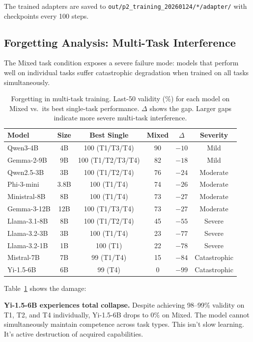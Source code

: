 \documentclass[11pt]{article}
\begin{document}
The trained adapters are saved to \texttt{out/p2\_training\_20260124/*/adapter/} with checkpoints every 100 steps.

\subsection{Forgetting Analysis: Multi-Task Interference}
\label{sec:forgetting}

The Mixed task condition exposes a severe failure mode: models that perform well on individual tasks suffer catastrophic degradation when trained on all tasks simultaneously.

\begin{table}[t]
\centering
\caption{Forgetting in multi-task training.  Last-50 validity (\%) for each model on Mixed vs.\ its best single-task performance.  $\Delta$ shows the gap.  Larger gaps indicate more severe multi-task interference.}
\label{tab:forgetting}
\begin{tabular}{l c ccc c}
\toprule
\textbf{Model} & \textbf{Size} & \textbf{Best Single} & \textbf{Mixed} & $\Delta$ & \textbf{Severity} \\
\midrule
Qwen3-4B & 4B & 100 (T1/T3/T4) & 90 & $-10$ & Mild \\
Gemma-2-9B & 9B & 100 (T1/T2/T3/T4) & 82 & $-18$ & Mild \\
Qwen2.5-3B & 3B & 100 (T1/T2/T4) & 76 & $-24$ & Moderate \\
Phi-3-mini & 3.8B & 100 (T1/T4) & 74 & $-26$ & Moderate \\
Ministral-8B & 8B & 100 (T1/T4) & 73 & $-27$ & Moderate \\
Gemma-3-12B & 12B & 100 (T1/T3/T4) & 73 & $-27$ & Moderate \\
Llama-3.1-8B & 8B & 100 (T1/T2/T4) & 45 & $-55$ & Severe \\
Llama-3.2-3B & 3B & 100 (T1/T4) & 23 & $-77$ & Severe \\
Llama-3.2-1B & 1B & 100 (T1) & 22 & $-78$ & Severe \\
Mistral-7B & 7B & 99 (T1/T4) & 15 & $-84$ & Catastrophic \\
Yi-1.5-6B & 6B & 99 (T4) & 0 & $-99$ & Catastrophic \\
\bottomrule
\end{tabular}
\end{table}

Table~\ref{tab:forgetting} shows the damage:

\textbf{Yi-1.5-6B experiences total collapse.} Despite achieving 98--99\% validity on T1, T2, and T4 individually, Yi-1.5-6B drops to 0\% on Mixed.  The model cannot simultaneously maintain competence across task types.  This isn't slow learning.  It's active destruction of acquired capabilities.
\end{document}
